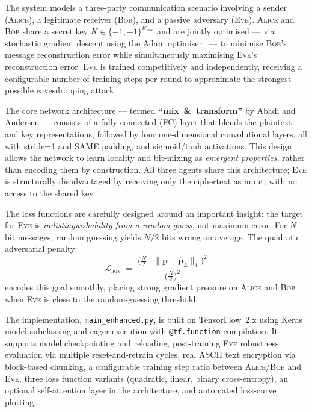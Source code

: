 \documentclass[12pt, a4paper]{article}
\newcommand{\alice}{\textsc{Alice}}
\newcommand{\bob}{\textsc{Bob}}
\newcommand{\eve}{\textsc{Eve}}
\newcommand{\code}[1]{\texttt{\color{CodeRed}#1}}
\newcommand{\N}{N}                 %
\begin{document}
\vspace{0.4cm}

The system models a three-party communication scenario involving a sender
(\alice{}), a legitimate receiver (\bob{}), and a passive adversary (\eve{}).
\alice{} and \bob{} share a secret key $K \in \{-1,+1\}^{K_{\text{size}}}$
and are jointly optimised — via stochastic gradient descent using the Adam
optimiser~\cite{kingma2014adam} — to minimise \bob{}'s message reconstruction
error while simultaneously maximising \eve{}'s reconstruction error.
\eve{} is trained competitively and independently, receiving a configurable
number of training steps per round to approximate the strongest possible
eavesdropping attack.

The core network architecture — termed \textbf{``mix~\&~transform''} by
Abadi and Andersen — consists of a fully-connected (FC) layer that blends
the plaintext and key representations, followed by four one-dimensional
convolutional layers, all with stride=1 and SAME padding, and sigmoid/tanh
activations. This design allows the network to learn locality and bit-mixing
as \emph{emergent properties}, rather than encoding them by construction.
All three agents share this architecture; \eve{} is structurally
disadvantaged by receiving only the ciphertext as input, with no access
to the shared key.

The loss functions are carefully designed around an important insight: the
target for \eve{} is \emph{indistinguishability from a random guess}, not
maximum error. For $\N$-bit messages, random guessing yields $\N/2$ bits
wrong on average. The quadratic adversarial penalty:
%
\begin{equation}
  \mathcal{L}_{\text{adv}}
  \;=\;
  \frac{\bigl(\tfrac{N}{2} - \|\mathbf{p} - \hat{\mathbf{p}}_E\|_1\bigr)^2}
       {\bigl(\tfrac{N}{2}\bigr)^2}
  \label{eq:adv_loss_abstract}
\end{equation}
%
encodes this goal smoothly, placing strong gradient pressure on \alice{}
and \bob{} when \eve{} is close to the random-guessing threshold.

The implementation, \code{main\_enhanced.py}, is built on
TensorFlow~2.x using Keras model subclassing and eager execution with
\code{@tf.function} compilation. It supports model checkpointing and
reloading, post-training \eve{} robustness evaluation via multiple
reset-and-retrain cycles, real ASCII text encryption
via block-based chunking, a configurable training step ratio between
\alice/\bob{} and \eve{}, three loss function variants (quadratic,
linear, binary cross-entropy), an optional self-attention layer in the
architecture, and automated loss-curve plotting.
\end{document}
